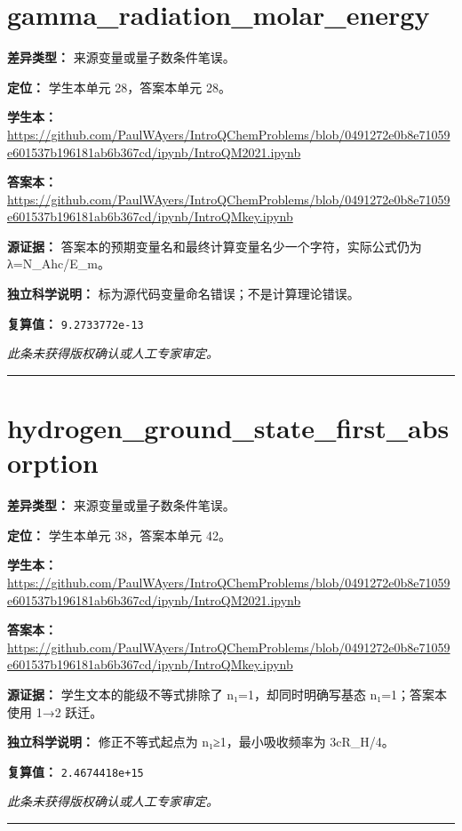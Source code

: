 \documentclass[UTF8,11pt,oneside,openany,fontset=none]{ctexbook}
\begin{document}
\section{gamma\_radiation\_molar\_energy}
\noindent\textbf{差异类型：} 来源变量或量子数条件笔误。\par
\noindent\textbf{定位：} 学生本单元 28，答案本单元 28。\par
\noindent\textbf{学生本：} \url{https://github.com/PaulWAyers/IntroQChemProblems/blob/0491272e0b8e71059e601537b196181ab6b367cd/ipynb/IntroQM2021.ipynb}\par
\noindent\textbf{答案本：} \url{https://github.com/PaulWAyers/IntroQChemProblems/blob/0491272e0b8e71059e601537b196181ab6b367cd/ipynb/IntroQMkey.ipynb}\par
\noindent\textbf{源证据：} 答案本的预期变量名和最终计算变量名少一个字符，实际公式仍为 λ=N\_Ahc/E\_m。\par
\noindent\textbf{独立科学说明：} 标为源代码变量命名错误；不是计算理论错误。\par
\noindent\textbf{复算值：} \texttt{9.2733772e-13}\par
\medskip\noindent\textit{此条未获得版权确认或人工专家审定。}
\medskip\hrule\medskip
\section{hydrogen\_ground\_state\_first\_absorption}
\noindent\textbf{差异类型：} 来源变量或量子数条件笔误。\par
\noindent\textbf{定位：} 学生本单元 38，答案本单元 42。\par
\noindent\textbf{学生本：} \url{https://github.com/PaulWAyers/IntroQChemProblems/blob/0491272e0b8e71059e601537b196181ab6b367cd/ipynb/IntroQM2021.ipynb}\par
\noindent\textbf{答案本：} \url{https://github.com/PaulWAyers/IntroQChemProblems/blob/0491272e0b8e71059e601537b196181ab6b367cd/ipynb/IntroQMkey.ipynb}\par
\noindent\textbf{源证据：} 学生文本的能级不等式排除了 n₁=1，却同时明确写基态 n₁=1；答案本使用 1→2 跃迁。\par
\noindent\textbf{独立科学说明：} 修正不等式起点为 n₁≥1，最小吸收频率为 3cR\_H/4。\par
\noindent\textbf{复算值：} \texttt{2.4674418e+15}\par
\medskip\noindent\textit{此条未获得版权确认或人工专家审定。}
\medskip\hrule\medskip
\end{document}
